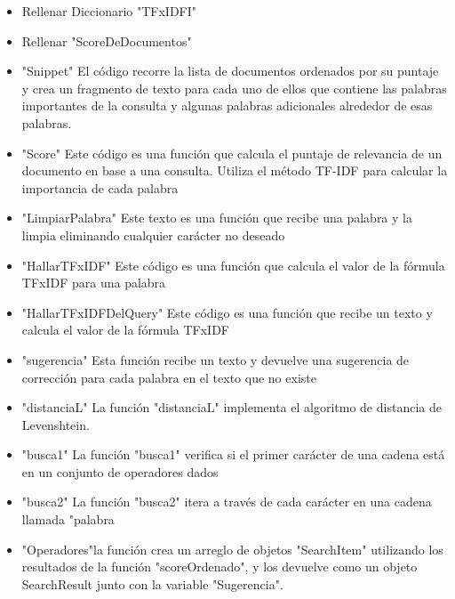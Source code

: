 \begin{frame}
\begin{itemize}
    \item Rellenar Diccionario "TFxIDFI" 
    \item Rellenar "ScoreDeDocumentos"
    \item "Snippet" El código recorre la lista de documentos ordenados por su puntaje y crea un 
    fragmento de texto para cada uno de ellos que contiene las palabras 
    importantes de la consulta y algunas palabras adicionales alrededor de esas 
    palabras. 
    \item "Score" 
    Este código es una función que calcula el puntaje de relevancia de un 
    documento en base a una consulta. Utiliza el método TF-IDF para calcular la 
    importancia de cada palabra
    \item "LimpiarPalabra"
    Este texto es una función que recibe una palabra y la limpia eliminando 
    cualquier carácter no deseado
    \item "HallarTFxIDF" 
    Este código es una función que calcula el valor de la fórmula TFxIDF para una 
    palabra
    \item "HallarTFxIDFDelQuery" 
    Este código es una función que recibe un texto y calcula el valor de la fórmula 
    TFxIDF
    
\end{itemize}
    
\end{frame}
\begin{frame}
    \begin{itemize}
        \item "sugerencia" 
        Esta función recibe un texto y devuelve una sugerencia de corrección para 
        cada palabra en el texto que no existe
        \item "distanciaL" 
        La función "distanciaL" implementa el algoritmo de distancia de Levenshtein.
        \item "busca1" 
        La función "busca1" verifica si el primer carácter de una cadena está en un 
        conjunto de operadores dados
        \item "busca2" 
     La función "busca2" itera a través de cada carácter en una cadena llamada 
    "palabra
        \item "Operadores"la función crea un arreglo de objetos "SearchItem" utilizando los 
        resultados de la función "scoreOrdenado", y los devuelve como un objeto 
        SearchResult junto con la variable "Sugerencia". 
    \end{itemize}
    
\end{frame}
